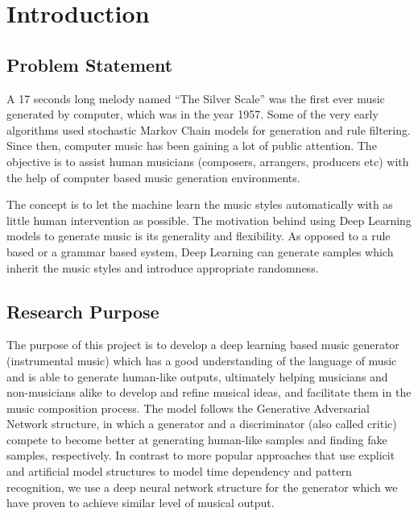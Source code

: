 \documentclass[12pt,oneside]{chicagocapstone}
\begin{document}
  \hypersetup{linkcolor=black}
  \setcounter{tocdepth}{2}
  \tableofcontents

  \listoffigures

  \listoftables


\mainmatter %
\pagestyle{fancyplain} %

\hypertarget{introduction}{%
\chapter*{Introduction}\label{introduction}}

\hypertarget{problem-statement}{%
\section*{Problem Statement}\label{problem-statement}}

A 17 seconds long melody named ``The Silver Scale'' was the first ever music generated by computer, which was in the year 1957. Some of the very early algorithms used stochastic Markov Chain models for generation and rule filtering. Since then, computer music has been gaining a lot of public attention. The objective is to assist human musicians (composers, arrangers, producers etc) with the help of computer based music generation environments.

The concept is to let the machine learn the music styles automatically with as little human intervention as possible. The motivation behind using Deep Learning models to generate music is its generality and flexibility. As opposed to a rule based or a grammar based system, Deep Learning can generate samples which inherit the music styles and introduce appropriate randomness.

\hypertarget{research-purpose}{%
\section*{Research Purpose}\label{research-purpose}}

The purpose of this project is to develop a deep learning based music generator (instrumental music) which has a good understanding of the language of music and is able to generate human-like outputs, ultimately helping musicians and non-musicians alike to develop and refine musical ideas, and facilitate them in the music composition process. The model follows the Generative Adversarial Network structure, in which a generator and a discriminator (also called critic) compete to become better at generating human-like samples and finding fake samples, respectively. In contrast to more popular approaches that use explicit and artificial model structures to model time dependency and pattern recognition, we use a deep neural network structure for the generator which we have proven to achieve similar level of musical output.
\end{document}
